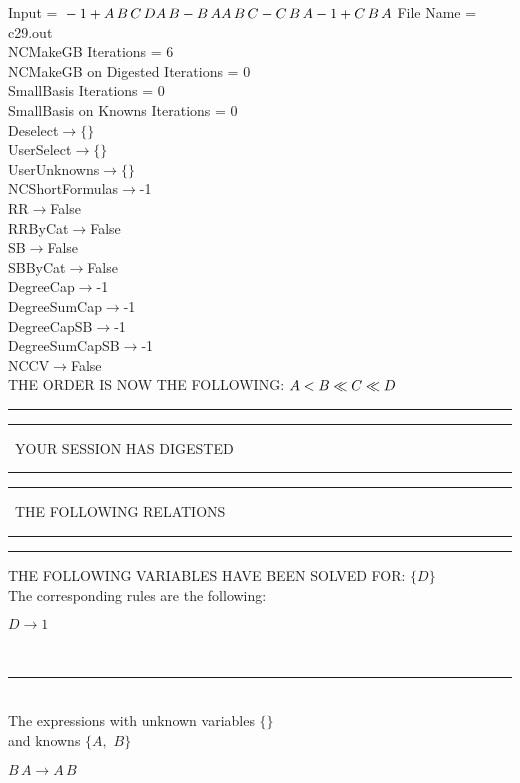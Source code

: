 \documentclass[rep10,leqno]{report}
\begin{document}
\normalsize
\baselineskip=12pt
\noindent
Input = 
$
\\-1 + A\,
 B\,
 C\,
 D\\
A\,
 B - B\,
 A\\
A\,
 B\,
 C - C\,
 B\,
 A\\
-1 + C\,
 B\,
 A\\
$
File Name = c29.out\\
NCMakeGB Iterations = 6\\
NCMakeGB on Digested Iterations = 0\\
SmallBasis Iterations = 0\\
SmallBasis on Knowns Iterations = 0\\
Deselect$\rightarrow \{\}$\\
UserSelect$\rightarrow \{\}$\\
UserUnknowns$\rightarrow \{\}$\\
NCShortFormulas$\rightarrow$-1\\
RR$\rightarrow $False\\
RRByCat$\rightarrow $False\\
SB$\rightarrow $False\\
SBByCat$\rightarrow $False\\
DegreeCap$\rightarrow $-1\\
DegreeSumCap$\rightarrow $-1\\
DegreeCapSB$\rightarrow $-1\\
DegreeSumCapSB$\rightarrow $-1\\
NCCV$\rightarrow $False\\
THE ORDER IS NOW THE FOLLOWING:\hfil\break
$
A<B\ll
C\ll
D\\
$
\rule[2pt]{6in}{4pt}\hfil\break
\rule[2pt]{1.879in}{4pt}
\ YOUR SESSION HAS DIGESTED\ 
\rule[2pt]{1.879in}{4pt}\hfil\break
\rule[2pt]{1.923in}{4pt}
\ THE FOLLOWING RELATIONS\ 
\rule[2pt]{1.923in}{4pt}\hfil\break
\rule[2pt]{6in}{4pt}\hfil\break
THE FOLLOWING VARIABLES HAVE BEEN SOLVED FOR:\hfil\break
$\{D\}$
\smallskip\\
The corresponding rules are the following:\smallskip\\
\begin{minipage}{6in}
$
D\rightarrow 1
$
\end{minipage}\medskip\\
\rule[3pt]{6in}{.7pt}\\
The expressions with unknown variables $\{\}$\\
and knowns $\{A,
$ $
B\}$\smallskip\\
\begin{minipage}{6in}
$
B\,
 A\rightarrow A\,
 B
$
\end{minipage}\\
\end{document}
